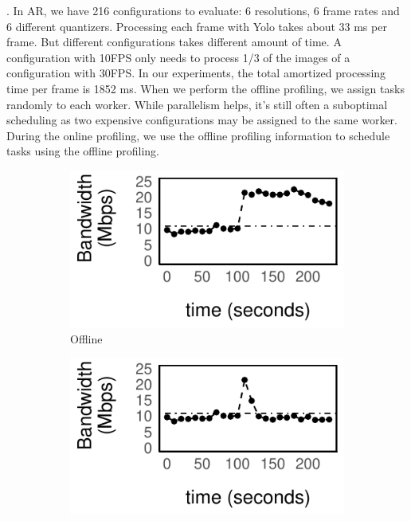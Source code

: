 . In AR, we have 216 configurations
to evaluate: 6 resolutions, 6 frame rates and 6 different quantizers. Processing
each frame with Yolo takes about 33 ms per frame. But different configurations
takes different amount of time. A configuration with 10FPS only needs to process
1/3 of the images of a configuration with 30FPS. In our experiments, the total
amortized processing time per frame is 1852 ms. When we perform the offline
profiling, we assign tasks randomly to each worker. While parallelism helps,
it's still often a suboptimal scheduling as two expensive configurations may be
assigned to the same worker. During the online profiling, we use the offline
profiling information to schedule tasks using the offline profiling.

\begin{figure}
  \centering
  \begin{subfigure}[t]{0.48\columnwidth}
    \centering
    \includegraphics[width=\textwidth]{figures/online1.pdf}
    \caption{Offline}
    \label{fig:offline}
  \end{subfigure}
  \hfill
  \begin{subfigure}[t]{0.48\columnwidth}
    \centering
    \includegraphics[width=\textwidth]{figures/online2.pdf}

\end{subfigure}
\end{figure}
